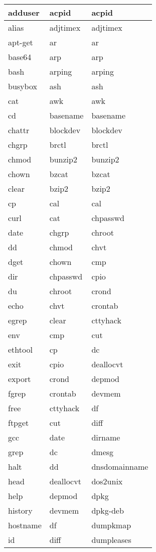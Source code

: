 \begin{longtable}{llp{50mm}}
adduser & acpid & acpid \\ \hline
alias & adjtimex & adjtimex \\ \hline
apt-get & ar & ar \\ \hline
base64 & arp & arp \\ \hline
bash & arping & arping \\ \hline
busybox & ash & ash \\ \hline
cat & awk & awk \\ \hline
cd & basename & basename \\ \hline
chattr & blockdev & blockdev \\ \hline
chgrp & brctl & brctl \\ \hline
chmod & bunzip2 & bunzip2 \\ \hline
chown & bzcat & bzcat \\ \hline
clear & bzip2 & bzip2 \\ \hline
cp & cal & cal \\ \hline
curl & cat & chpasswd \\ \hline
date & chgrp & chroot \\ \hline
dd & chmod & chvt \\ \hline
dget & chown & cmp \\ \hline
dir & chpasswd & cpio \\ \hline
du & chroot & crond \\ \hline
echo & chvt & crontab \\ \hline
egrep & clear & cttyhack \\ \hline
env & cmp & cut \\ \hline
ethtool & cp & dc \\ \hline
exit & cpio & deallocvt \\ \hline
export & crond & depmod \\ \hline
fgrep & crontab & devmem \\ \hline
free & cttyhack & df \\ \hline
ftpget & cut & diff \\ \hline
gcc & date & dirname \\ \hline
grep & dc & dmesg \\ \hline
halt & dd & dnsdomainname \\ \hline
head & deallocvt & dos2unix \\ \hline
help & depmod & dpkg \\ \hline
history & devmem & dpkg-deb \\ \hline
hostname & df & dumpkmap \\ \hline
id & diff & dumpleases \\ \hline

\end{longtable}
